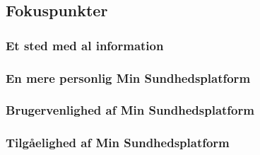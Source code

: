 \subsection{Fokuspunkter}
\subsubsection{Et sted med al information}
\subsubsection{En mere personlig Min Sundhedsplatform}
\subsubsection{Brugervenlighed af Min Sundhedsplatform}
\subsubsection{Tilgåelighed af Min Sundhedsplatform}
